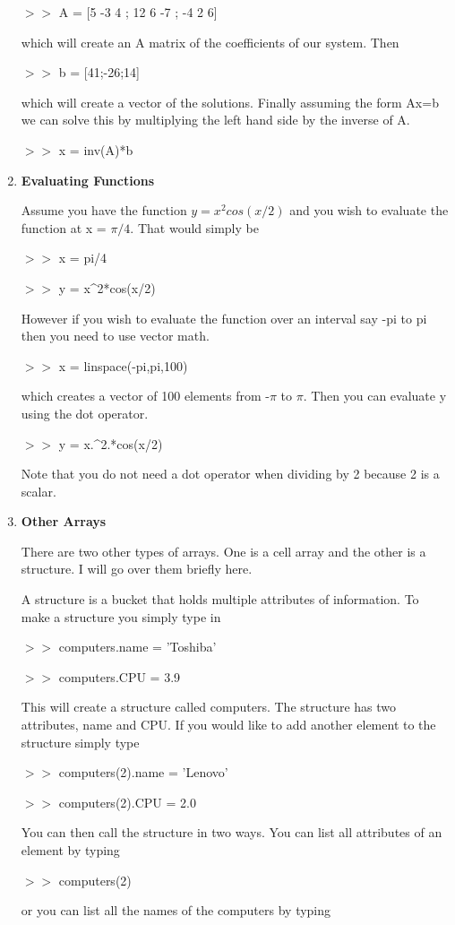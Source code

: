 \begin{enumerate}
$>>$ A = [5 -3 4 ; 12 6 -7 ; -4 2 6]

which will create an A matrix of the coefficients of our system. Then

$>>$ b = [41;-26;14]

which will create a vector of the solutions. Finally assuming the form
Ax=b we can solve this by multiplying the left hand side by the
inverse of A.

$>>$ x = inv(A)*b

\item {\bf Evaluating Functions}

Assume you have the function $y = x^2cos(x/2)$ and you wish to
evaluate the function at x = $\pi/4$. That would simply be

$>>$ x = pi/4

$>>$ y = x\textrm{\^}2*cos(x/2)

However if you wish to evaluate the function over an interval say -pi
to pi then you need to use vector math.

$>>$ x = linspace(-pi,pi,100)

which creates a vector of 100 elements from -$\pi$ to $\pi$. Then you
can evaluate y using the dot operator.

$>>$ y = x.\textrm{\^}2.*cos(x/2)

Note that you do not need a dot operator when dividing by 2 because 2
is a scalar.

\item {\bf Other Arrays}

There are two other types of arrays. One is a cell array and the other
is a structure. I will go over them briefly here. 

A structure is a bucket that holds multiple attributes of
information. To make a structure you simply type in

$>>$ computers.name = 'Toshiba'

$>>$ computers.CPU = 3.9

This will create a structure called computers. The structure has two
attributes, name and CPU. If you would like to add another element to
the structure simply type 

$>>$ computers(2).name = 'Lenovo'

$>>$ computers(2).CPU = 2.0

You can then call the structure in two ways. You can list all
attributes of an element by typing

$>>$ computers(2)

or you can list all the names of the computers by typing


\end{enumerate}
